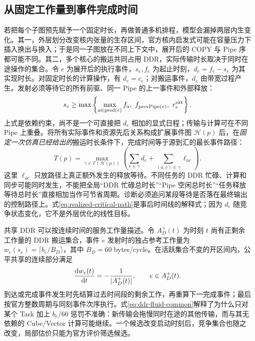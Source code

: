 \subsection{从固定工作量到事件完成时间}
若把每个子图预先赋予一个固定时长，再做普通多机排程，模型会漏掉两层内生变化。其一，外层划分改变核内张量的生存区间，官方核内启发式可能在容量压力下插入换出与换入；于是同一子图放在不同上下文中，展开后的 COPY 与 Pipe 序都可能不同。其二，多个核心的搬运共同占用 DDR，实际传输时长取决于同时在途操作的集合。令 $e$ 为展开后的执行事件，$s_e,f_e$ 为起止时刻，$d_e=f_e-s_e$ 为其实现时长。对固定时长的计算操作，有 $d_e=c_e$；对搬运事件，$d_e$ 由带宽过程产生。发射必须等待它的所有前驱、同一 Pipe 的上一事件和外部释放：
\begin{equation}\label{eq:event-release}
s_e\ge
\max\left\{
\max_{a\in\operatorname{pred}(e)}f_a,\
f_{\operatorname{prevPipe}(e)},\
r_e^{\rm ext}
\right\}.
\end{equation}
上式是依赖约束，尚不是一个可直接把 $d_e$ 相加的显式日程；传输与计算可在不同 Pipe 上重叠。将所有实际事件和资源先后关系构成扩展事件图 $\mathcal H(p)$ 后，在\emph{固定一次仿真已经给出的}搬运时长条件下，完成时间等于源到汇的最长事件路径：
\begin{equation}\label{eq:realized-critical-path}
T(p)=\max_{\gamma\in\Gamma(\mathcal H(p))}
\left(\sum_{e\in\gamma}d_e+
\sum_{(a,e)\in\gamma}\ell_{ae}\right).
\end{equation}
这里 $\ell_{ae}$ 只放路径上真正额外发生的释放等待。不同任务的 DDR 忙碌、计算和同步可能同时发生，不能把全局“DDR 忙碌总时长”“Pipe 空闲总时长”“任务释放等待总时长”直接相加当作可节省周期。诊断必须追问某段等待是否落在最终输出的控制路径上。式\eqref{eq:realized-critical-path}是事后时间线的解释式；因为 $d_e$ 随竞争状态变化，它不是外层优化的线性目标。

共享 DDR 可以按连续时间的服务工作量描述。令 $A_D^+(t)$ 为时刻 $t$ 尚有正剩余工作量的 DDR 搬运集合，事件 $e$ 发射时的独占参考工作量为 $w_e(s_e)=\lceil b_e/B_D\rceil$，其中 $B_D=60$ bytes/cycle。在活跃集合不变的开区间内，公平共享的连续部分满足
\begin{equation}\label{eq:ddr-fluid-common}
\frac{{\rm d}w_e(t)}{{\rm d}t}=-\frac{1}{|A_D^+(t)|},
\qquad e\in A_D^+(t).
\end{equation}
到达或完成事件发生时先结算过去时间段的剩余工作，再重算下一完成事件；最后按官方整数周期与同刻事件次序执行。式\eqref{eq:ddr-fluid-common}解释了为什么只对某个 Task 加上 $b_e/60$ 惩罚不准确：新传输会拖慢同时在途的其他传输，而与其无依赖的 Cube/Vector 计算可能继续。一个候选改变启动时刻后，竞争集合也随之改变，局部估价只能为官方评价筛选候选。

